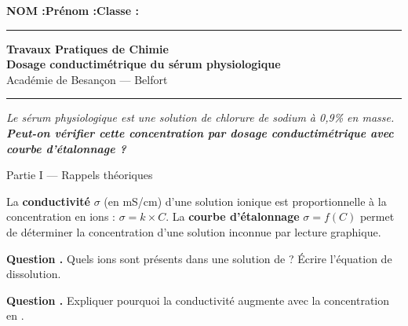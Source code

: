 \documentclass[11pt,a4paper]{article}
\newcommand{\sectitle}[1]{%
  \vspace{6pt}
  \noindent\colorbox{exoheader}{\parbox{\dimexpr\linewidth-2\fboxsep}%
    {\color{white}\bfseries\large\strut\quad #1}}
  \vspace{4pt}
}
\newcounter{question}
\newcommand{\question}{%
  \stepcounter{question}%
  \noindent\textcolor{exoheader}{\textbf{Question \thequestion.}}\quad
}
\begin{document}
\noindent\textbf{NOM :}\hfill\textbf{Prénom :}\hfill\textbf{Classe :}\hfill\phantom{x}\\[0.2cm]
\hrule\vspace{0.2cm}

\begin{center}
  {\large\bfseries\textcolor{exoheader}{Travaux Pratiques de Chimie}}\\[4pt]
  {\LARGE\bfseries Dosage conductimétrique du sérum physiologique}\\[2pt]
  {\small Académie de Besançon --- Belfort}
\end{center}
\hrule\vspace{6pt}

\begin{tcolorbox}[enhanced, colback=problemebg, colframe=exoheader, boxrule=1.5pt,
  title={\faFlask\quad Problématique},
  fonttitle=\bfseries\color{white},
  attach boxed title to top left={yshift=-2mm, xshift=4mm},
  boxed title style={colback=exoheader, colframe=exoheader}]
\textit{Le sérum physiologique est une solution de chlorure de sodium à 0,9\% en masse.
\textbf{Peut-on vérifier cette concentration par dosage conductimétrique avec courbe d'étalonnage ?}}
\end{tcolorbox}

\vspace{6pt}

\sectitle{Partie I --- Rappels théoriques}

\begin{mdframed}[backgroundcolor=exolight, linecolor=exoheader, linewidth=1.2pt]
La \textbf{conductivité} $\sigma$ (en mS/cm) d'une solution ionique est proportionnelle
à la concentration en ions : $\sigma = k \times C$.
La \textbf{courbe d'étalonnage} $\sigma = f(C)$ permet de déterminer la concentration
d'une solution inconnue par lecture graphique.
\end{mdframed}

\vspace{4pt}
\question Quels ions sont présents dans une solution de  ? Écrire l'équation de dissolution.

\vspace{0.3cm}\noindent\dotfill

\question Expliquer pourquoi la conductivité augmente avec la concentration en . \dotfill
\end{document}
